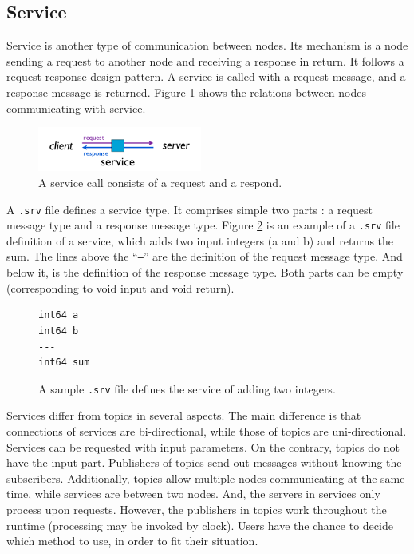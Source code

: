 \documentclass[a4paper, 10pt, conference]{ieeeconf}       %
\begin{document}
\subsection{Service}

Service is another type of communication between nodes. Its mechanism is a node sending a request to another node and receiving a response in return. It follows a request-response design pattern. A service is called with a request message, and a response message is returned. Figure \ref{fig:service} shows the relations between nodes communicating with service.

\begin{figure}[htpb]
  \centering
  \includegraphics[width=0.48\textwidth]{service}
  \caption{A service call consists of a request and a respond.}
  \label{fig:service}
\end{figure}

A \texttt{.srv} file defines a service type. It comprises simple two parts : a request message type and a response message type. Figure \ref{fig:srvfile} is an example of a \texttt{.srv} file definition of a service, which adds two input integers (a and b) and returns the sum. The lines above the ``\texttt{---}'' are the definition of the request message type. And below it, is the definition of the response message type. Both parts can be empty (corresponding to void input and void return).

\begin{figure}[htpb]
  \centering
\begin{Verbatim}[frame=single]
int64 a
int64 b
---
int64 sum
\end{Verbatim}
  \caption{A sample \texttt{.srv} file defines the service of adding two integers.}
  \label{fig:srvfile}
\end{figure}

  Services differ from topics in several aspects. The main difference is that connections of services are bi-directional, while those of topics are uni-directional. Services can be requested with input parameters. On the contrary, topics do not have the input part. Publishers of topics send out messages without knowing the subscribers. Additionally, topics allow multiple nodes communicating at the same time, while services are between two nodes. And, the servers in services only process upon requests. However, the publishers in topics work throughout the runtime (processing may be invoked by clock). Users have the chance to decide which method to use, in order to fit their situation.
\end{document}
